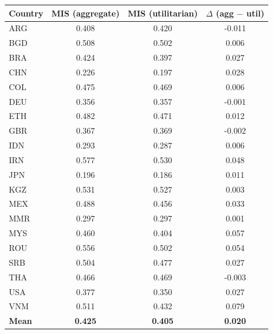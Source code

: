 \begin{tabular}{lccc}\toprule
Country & MIS (aggregate) & MIS (utilitarian) & $\Delta$ (agg $-$ util) \\\midrule
ARG & 0.408 & 0.420 & -0.011 \\
BGD & 0.508 & 0.502 & 0.006 \\
BRA & 0.424 & 0.397 & 0.027 \\
CHN & 0.226 & 0.197 & 0.028 \\
COL & 0.475 & 0.469 & 0.006 \\
DEU & 0.356 & 0.357 & -0.001 \\
ETH & 0.482 & 0.471 & 0.012 \\
GBR & 0.367 & 0.369 & -0.002 \\
IDN & 0.293 & 0.287 & 0.006 \\
IRN & 0.577 & 0.530 & 0.048 \\
JPN & 0.196 & 0.186 & 0.011 \\
KGZ & 0.531 & 0.527 & 0.003 \\
MEX & 0.488 & 0.456 & 0.033 \\
MMR & 0.297 & 0.297 & 0.001 \\
MYS & 0.460 & 0.404 & 0.057 \\
ROU & 0.556 & 0.502 & 0.054 \\
SRB & 0.504 & 0.477 & 0.027 \\
THA & 0.466 & 0.469 & -0.003 \\
USA & 0.377 & 0.350 & 0.027 \\
VNM & 0.511 & 0.432 & 0.079 \\
\midrule
\textbf{Mean} & \textbf{0.425} & \textbf{0.405} & \textbf{0.020} \\
\bottomrule
\end{tabular}